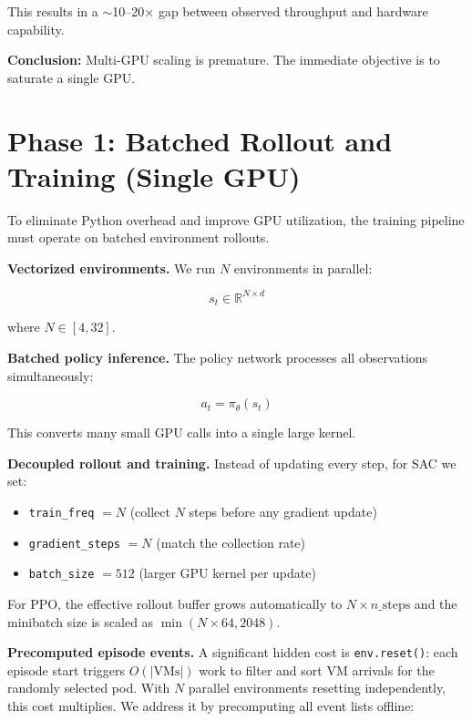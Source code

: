 \documentclass[11pt]{article}
\begin{document}
This results in a $\sim$10--20$\times$ gap between observed throughput and
hardware capability.

\textbf{Conclusion:} Multi-GPU scaling is premature. The immediate objective is
to saturate a single GPU.

\section{Phase 1: Batched Rollout and Training (Single GPU)}

To eliminate Python overhead and improve GPU utilization, the training
pipeline must operate on batched environment rollouts.

\textbf{Vectorized environments.}
We run $N$ environments in parallel:

\begin{equation}
  s_t \in \mathbb{R}^{N \times d}
\end{equation}

where $N \in [4, 32]$.

\textbf{Batched policy inference.}
The policy network processes all observations simultaneously:

\begin{equation}
  a_t = \pi_\theta(s_t)
\end{equation}

This converts many small GPU calls into a single large kernel.

\textbf{Decoupled rollout and training.}
Instead of updating every step, for SAC we set:

\begin{itemize}
    \item \texttt{train\_freq} $= N$ (collect $N$ steps before any gradient update)
    \item \texttt{gradient\_steps} $= N$ (match the collection rate)
    \item \texttt{batch\_size} $= 512$ (larger GPU kernel per update)
\end{itemize}

For PPO, the effective rollout buffer grows automatically to $N \times n\_\text{steps}$
and the minibatch size is scaled as $\min(N \times 64, 2048)$.

\textbf{Precomputed episode events.}
A significant hidden cost is \texttt{env.reset()}: each episode start
triggers $O(|\text{VMs}|)$ work to filter and sort VM arrivals for the
randomly selected pod.  With $N$ parallel environments resetting independently,
this cost multiplies.  We address it by precomputing all event lists offline:
\end{document}
